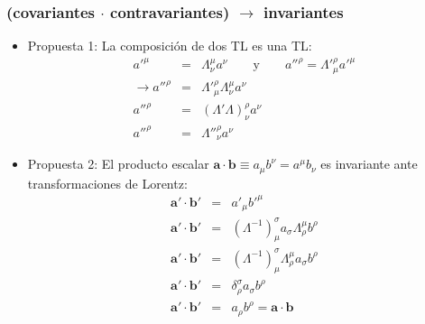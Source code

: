 \documentclass[xetex,mathserif,serif,10pt]{beamer}
\begin{document}
\begin{frame}
\frametitle{(covariantes $\cdot$ contravariantes) $\to$ invariantes}
  \begin{itemize}
    \item Propuesta 1: \alert{La composición de dos TL es una TL}:
      \begin{eqnarray}
        a'^\mu &=& \Lambda^{\mu}_{\nu} a^\nu \qquad \mathrm{y} \qquad a''^\rho = \Lambda'^{\rho}_{\mu} a'^\mu \nonumber\\
        \to a''^\rho &=& \Lambda'^{\rho}_{\mu} \Lambda^{\mu}_{\nu} a^\nu \nonumber\\
        a''^\rho &=& \left (\Lambda' \Lambda \right)^{\rho}_{\nu} a^\nu \nonumber\\
        a''^\rho &=& \Lambda''^{\rho}_{\nu} a^\nu
      \end{eqnarray}
    \item Propuesta 2: \alert{El producto escalar $\mathbf{a}\cdot\mathbf{b}\equiv a_\mu b^\nu = a^\mu b_\nu$ es invariante ante transformaciones de Lorentz}:
      \begin{eqnarray}
        \mathbf{a'} \cdot \mathbf{b'} &=& a'_\mu b'^\mu \nonumber\\
        \mathbf{a'} \cdot \mathbf{b'} &=& (\Lambda^{-1})_\mu^\sigma a_\sigma \Lambda_\rho^\mu b^\rho \nonumber\\
        \mathbf{a'} \cdot \mathbf{b'} &=& (\Lambda^{-1})_\mu^\sigma \Lambda_\rho^\mu a_\sigma  b^\rho \nonumber\\
        \mathbf{a'} \cdot \mathbf{b'} &=& \delta^\sigma_\rho a_\sigma b^\rho \nonumber\\
        \mathbf{a'} \cdot \mathbf{b'} &=& a_\rho b^\rho = \mathbf{a} \cdot \mathbf{b}
      \end{eqnarray}
  \end{itemize}
\end{frame}
\end{document}

